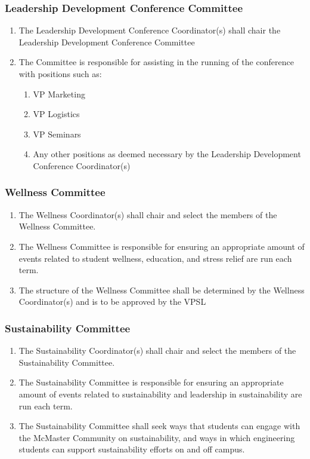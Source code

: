 \subsubsection{Leadership Development Conference Committee}
\label{leadership-development-conference-committee}
\begin{enumerate}
 \item
  The Leadership Development Conference Coordinator(s) shall chair the
  Leadership Development Conference Committee
 \item
  The Committee is responsible for assisting in the running of the
  conference with positions such as:

  \begin{enumerate}
   \item
    VP Marketing
   \item
    VP Logistics
   \item
    VP Seminars
   \item
    Any other positions as deemed necessary by the Leadership
    Development Conference Coordinator(s)

  \end{enumerate}
\end{enumerate}

\subsubsection{Wellness Committee}
\label{wellness-committee}
\begin{enumerate}
 \item
  The Wellness Coordinator(s) shall chair and select the members of the
  Wellness Committee.
 \item
  The Wellness Committee is responsible for ensuring an appropriate
  amount of events related to student wellness, education, and stress
  relief are run each term.
 \item
  The structure of the Wellness Committee shall be determined by the
  Wellness Coordinator(s) and is to be approved by the VPSL

\end{enumerate}

\subsubsection{Sustainability Committee}
\label{sustainability-committee}
\begin{enumerate}
 \item
  The Sustainability Coordinator(s) shall chair and select the members
  of the Sustainability Committee.
 \item
  The Sustainability Committee is responsible for ensuring an
  appropriate amount of events related to sustainability and leadership
  in sustainability are run each term.
 \item
  The Sustainability Committee shall seek ways that students can engage
  with the McMaster Community on sustainability, and ways in which
  engineering students can support sustainability efforts on and off
  campus.
\end{enumerate}

